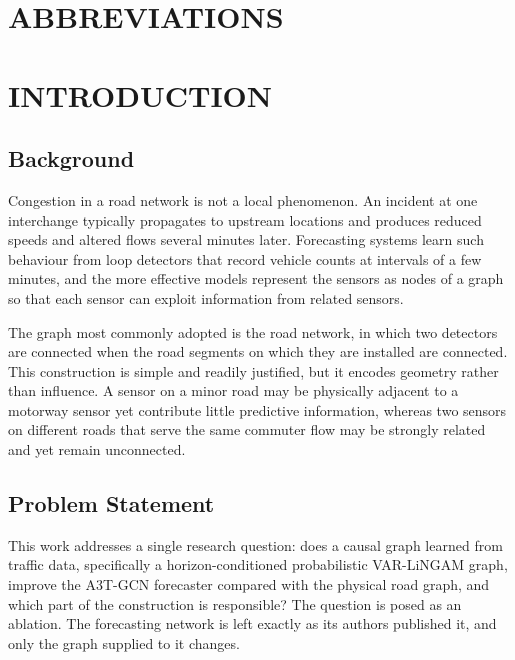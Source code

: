 \documentclass[MTech]{ugthesis}
\begin{document}
\chapter*{ABBREVIATIONS}
\begin{acronym}[A3T-GCN]
\end{acronym}

\chapter{INTRODUCTION}

\section{Background}
Congestion in a road network is not a local phenomenon. An incident at one interchange typically propagates to upstream locations and produces reduced speeds and altered flows several minutes later. Forecasting systems learn such behaviour from loop detectors that record vehicle counts at intervals of a few minutes, and the more effective models represent the sensors as nodes of a graph so that each sensor can exploit information from related sensors.

The graph most commonly adopted is the road network, in which two detectors are connected when the road segments on which they are installed are connected. This construction is simple and readily justified, but it encodes geometry rather than influence. A sensor on a minor road may be physically adjacent to a motorway sensor yet contribute little predictive information, whereas two sensors on different roads that serve the same commuter flow may be strongly related and yet remain unconnected.

\section{Problem Statement}
This work addresses a single research question: does a causal graph learned from traffic data, specifically a horizon-conditioned probabilistic VAR-LiNGAM graph, improve the A3T-GCN forecaster compared with the physical road graph, and which part of the construction is responsible? The question is posed as an ablation. The forecasting network is left exactly as its authors published it, and only the graph supplied to it changes.
\end{document}
